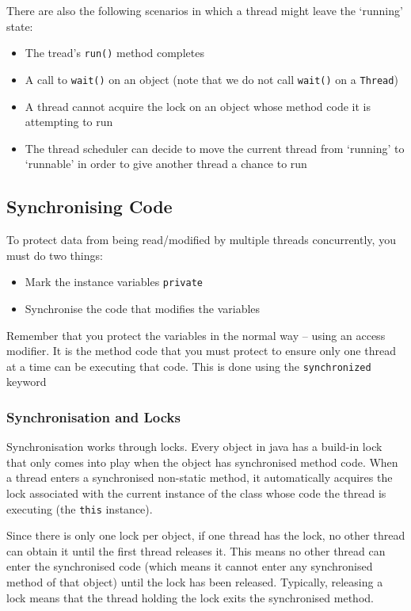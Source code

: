 There are also the following scenarios in which a thread might leave the 
`running' state:
\begin{itemize}
    \item The tread's \verb#run()# method completes
    \item A call to \verb#wait()# on an object (note that we do not call 
    \verb#wait()# on a \verb#Thread#)
    \item A thread cannot acquire the lock on an object whose method code it is 
    attempting to run
    \item The thread scheduler can decide to move the current thread from 
    `running' to `runnable' in order to give another thread a chance to run
\end{itemize}

\subsection{Synchronising Code}
To protect data from being read/modified by multiple threads concurrently, you 
must do two things:
\begin{itemize}
    \item Mark the instance variables \verb#private#
    \item Synchronise the code that modifies the variables
\end{itemize}
Remember that you protect the variables in the normal way -- using an access 
modifier. It is the method code that you must protect to ensure only one thread 
at a time can be executing that code. This is done using the 
\verb#synchronized# keyword

\subsubsection{Synchronisation and Locks}
Synchronisation works through locks. Every object in java has a build-in lock 
that only comes into play when the object has synchronised method code. When a 
thread enters a synchronised non-static method, it automatically acquires the 
lock associated with the current instance of the class whose code the thread is 
executing (the \verb#this# instance).

Since there is only one lock per object, if one thread has the lock, no other 
thread can obtain it until the first thread releases it. This means no other 
thread can enter the synchronised code (which means it cannot enter any 
synchronised method of that object) until the lock has been released.  
Typically, releasing a lock means that the thread holding the lock exits the 
synchronised method.

